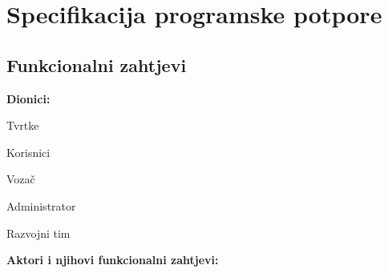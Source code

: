 \chapter{Specifikacija programske potpore}
		
	\section{Funkcionalni zahtjevi}
			
			\noindent \textbf{Dionici:}
			
			\begin{packed_enum}
				
				\item Tvrtke	
				\item Korisnici
				
				\begin{packed_enum}
					

					\item Vozač
					
				\end{packed_enum}
				
				\item Administrator
				\item Razvojni tim
			
			\end{packed_enum}
			
			\noindent \textbf{Aktori i njihovi funkcionalni zahtjevi:}
			

